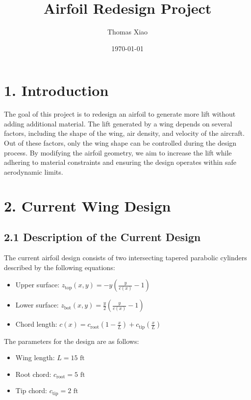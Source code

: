 \documentclass[12pt]{article}
\title{Airfoil Redesign Project}
\author{Thomas Xiao}
\date{\today}
\begin{document}
\maketitle

\section*{1. Introduction}

The goal of this project is to redesign an airfoil to generate more lift without adding additional material. The lift generated by a wing depends on several factors, including the shape of the wing, air density, and velocity of the aircraft. Out of these factors, only the wing shape can be controlled during the design process. By modifying the airfoil geometry, we aim to increase the lift while adhering to material constraints and ensuring the design operates within safe aerodynamic limits.

\section*{2. Current Wing Design}

\subsection*{2.1 Description of the Current Design}

The current airfoil design consists of two intersecting tapered parabolic cylinders described by the following equations:
\begin{itemize}
    \item Upper surface: \( z_{\text{top}}(x, y) = -y  \left( \frac{y}{c(x)} - 1 \right) \)
    \item Lower surface: \( z_{\text{bot}}(x, y) = \frac{y}{2} \left( \frac{y}{c(x)} - 1 \right) \)
    \item Chord length: \( c(x) = c_{\text{root}} \left( 1 - \frac{x}{L} \right) + c_{\text{tip}}  \left(\frac{x}{L}\right) \)
\end{itemize}

The parameters for the design are as follows:
\begin{itemize}
    \item Wing length: \( L = 15 \text{ ft} \)
    \item Root chord: \( c_{\text{root}} = 5 \text{ ft} \)
    \item Tip chord: \( c_{\text{tip}} = 2 \text{ ft} \)
\end{itemize}
\end{document}
